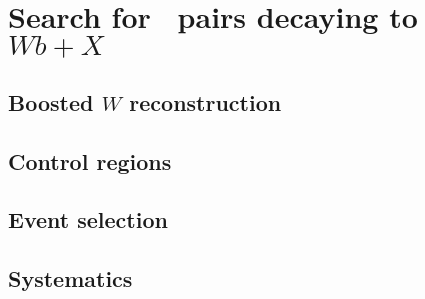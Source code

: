 
\section{Search for \TTbar\ pairs decaying to $Wb+X$}\label{sec:wbx}

\subsection{Boosted $W$ reconstruction}\label{subsec:boostedW}

\subsection{Control regions}\label{sec:wbxCR}

\subsection{Event selection}\label{sec:wbxEVT}



\subsection{Systematics}\label{sec:wbxSYS}
